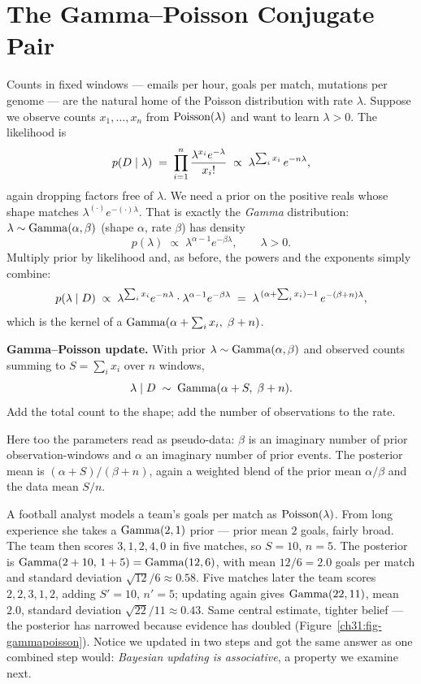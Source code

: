 \section{The Gamma--Poisson Conjugate Pair}
\label{ch31:gamma-poisson}

Counts in fixed windows --- emails per hour, goals per match, mutations per genome --- are
the natural home of the Poisson distribution with rate $\lambda$. Suppose we observe counts
$x_1,\dots,x_n$ from $\operatorname{Poisson}(\lambda)$ and want to learn $\lambda > 0$. The likelihood is
\[
  p(D \mid \lambda) \;=\; \prod_{i=1}^{n}\frac{\lambda^{x_i}e^{-\lambda}}{x_i!}
  \;\propto\; \lambda^{\sum_i x_i}\, e^{-n\lambda},
\]
again dropping factors free of $\lambda$. We need a prior on the positive reals whose shape
matches $\lambda^{(\cdot)}e^{-(\cdot)\lambda}$. That is exactly the \emph{Gamma}
distribution: $\lambda\sim\operatorname{Gamma}(\alpha,\beta)$ (shape $\alpha$, rate $\beta$) has density
\[
  p(\lambda) \;\propto\; \lambda^{\alpha-1}e^{-\beta\lambda},\qquad \lambda>0.
\]
Multiply prior by likelihood and, as before, the powers and the exponents simply combine:
\[
  p(\lambda\mid D)\;\propto\;
  \lambda^{\sum_i x_i}e^{-n\lambda}\cdot\lambda^{\alpha-1}e^{-\beta\lambda}
  \;=\;\lambda^{\,(\alpha + \sum_i x_i)-1}\,e^{-(\beta + n)\lambda},
\]
which is the kernel of a $\operatorname{Gamma}(\alpha + \sum_i x_i,\; \beta + n)$.

\begin{formalbox}
\textbf{Gamma--Poisson update.} With prior $\lambda\sim\operatorname{Gamma}(\alpha,\beta)$ and observed
counts summing to $S=\sum_i x_i$ over $n$ windows,
\begin{equation}
  \lambda\mid D \;\sim\; \operatorname{Gamma}(\alpha + S,\; \beta + n).
  \label{ch31:gamma-update}
\end{equation}
Add the total count to the shape; add the number of observations to the rate.
\end{formalbox}

Here too the parameters read as pseudo-data: $\beta$ is an imaginary number of prior
observation-windows and $\alpha$ an imaginary number of prior events. The posterior mean is
$(\alpha + S)/(\beta + n)$, again a weighted blend of the prior mean $\alpha/\beta$ and the
data mean $S/n$.

\begin{example}
\label{ch31:ex-goals}
A football analyst models a team's goals per match as $\operatorname{Poisson}(\lambda)$. From long
experience she takes a $\operatorname{Gamma}(2,1)$ prior --- prior mean $2$ goals, fairly broad. The team
then scores $3, 1, 2, 4, 0$ in five matches, so $S=10$, $n=5$. The posterior is
$\operatorname{Gamma}(2+10,\,1+5)=\operatorname{Gamma}(12,6)$, with mean $12/6 = 2.0$ goals per match and standard
deviation $\sqrt{12}/6 \approx 0.58$. Five matches later the team scores $2,2,3,1,2$,
adding $S'=10$, $n'=5$; updating again gives $\operatorname{Gamma}(22,11)$, mean $2.0$, standard deviation
$\sqrt{22}/11\approx 0.43$. Same central estimate, tighter belief --- the posterior has
narrowed because evidence has doubled (Figure~\ref{ch31:fig-gammapoisson}). Notice we updated in two steps and got the same
answer as one combined step would: \emph{Bayesian updating is associative}, a property we
examine next.
\end{example}

